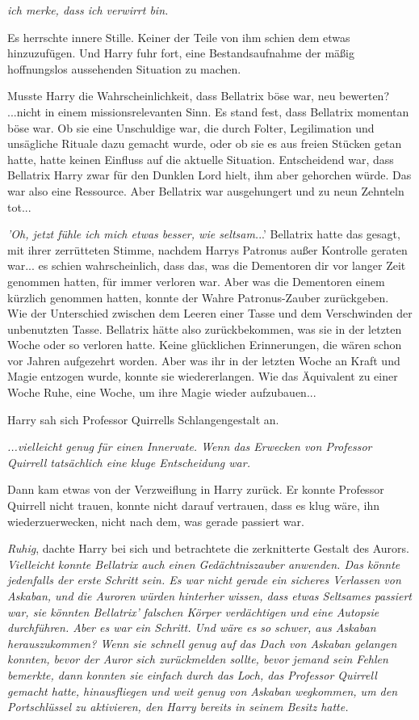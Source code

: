 {\emph{ich merke, dass ich verwirrt bin.}

Es herrschte innere Stille. Keiner der Teile von ihm schien dem etwas hinzuzufügen. Und Harry fuhr fort, eine Bestandsaufnahme der mäßig hoffnungslos aussehenden Situation zu machen.

Musste Harry die Wahrscheinlichkeit, dass Bellatrix böse war, neu bewerten?\\ ...nicht in einem missionsrelevanten Sinn. Es stand fest, dass Bellatrix momentan böse war. Ob sie eine Unschuldige war, die durch Folter, Legilimation und unsägliche Rituale dazu gemacht wurde, oder ob sie es aus freien Stücken getan hatte, hatte keinen Einfluss auf die aktuelle Situation. Entscheidend war, dass Bellatrix Harry zwar für den Dunklen Lord hielt, ihm aber gehorchen würde. Das war also eine Ressource. Aber Bellatrix war ausgehungert und zu neun Zehnteln tot...

\emph{'Oh, jetzt fühle ich mich etwas besser, wie seltsam.}..' Bellatrix hatte das gesagt, mit ihrer zerrütteten Stimme, nachdem Harrys Patronus außer Kontrolle geraten war... es schien wahrscheinlich, dass das, was die Dementoren dir vor langer Zeit genommen hatten, für immer verloren war. Aber was die Dementoren einem kürzlich genommen hatten, konnte der Wahre Patronus-Zauber zurückgeben.\\ Wie der Unterschied zwischen dem Leeren einer Tasse und dem Verschwinden der unbenutzten Tasse. Bellatrix hätte also zurückbekommen, was sie in der letzten Woche oder so verloren hatte. Keine glücklichen Erinnerungen, die wären schon vor Jahren aufgezehrt worden. Aber was ihr in der letzten Woche an Kraft und Magie entzogen wurde, konnte sie wiedererlangen. Wie das Äquivalent zu einer Woche Ruhe, eine Woche, um ihre Magie wieder aufzubauen...

Harry sah sich Professor Quirrells Schlangengestalt an.

\emph{...vielleicht genug für einen Innervate. Wenn das Erwecken von Professor Quirrell tatsächlich eine kluge Entscheidung war.}

Dann kam etwas von der Verzweiflung in Harry zurück. Er konnte Professor Quirrell nicht trauen, konnte nicht darauf vertrauen, dass es klug wäre, ihn wiederzuerwecken, nicht nach dem, was gerade passiert war.

\emph{Ruhig}, dachte Harry bei sich und betrachtete die zerknitterte Gestalt des Aurors. \emph{Vielleicht konnte Bellatrix auch einen Gedächtniszauber anwenden. Das könnte jedenfalls der erste Schritt sein. Es war nicht gerade ein sicheres Verlassen von Askaban, und die Auroren würden hinterher wissen, dass etwas Seltsames passiert war, sie könnten Bellatrix' falschen Körper verdächtigen und eine Autopsie durchführen. Aber es war ein Schritt. Und wäre es so schwer, aus Askaban herauszukommen? Wenn sie schnell genug auf das Dach von Askaban gelangen konnten, bevor der Auror sich zurückmelden sollte, bevor jemand sein Fehlen bemerkte, dann konnten sie einfach durch das Loch, das Professor Quirrell gemacht hatte, hinausfliegen und weit genug von Askaban wegkommen, um den Portschlüssel zu aktivieren, den Harry bereits in seinem Besitz hatte.}

}
